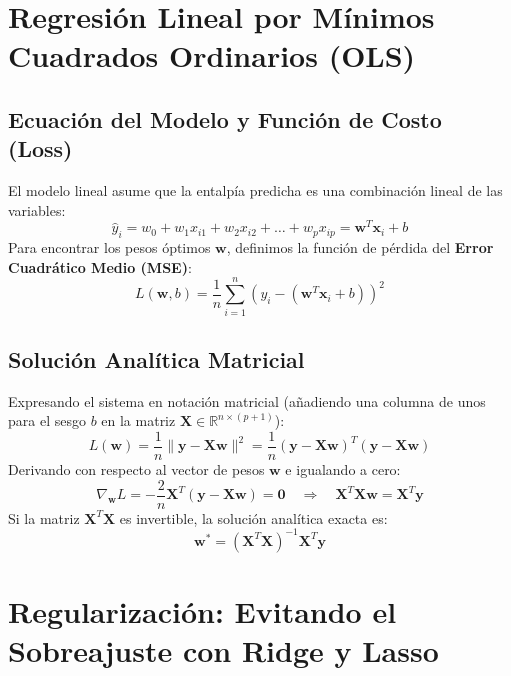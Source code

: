 \documentclass[11pt,letterpaper]{report}
\begin{document}
\section{Regresión Lineal por Mínimos Cuadrados Ordinarios (OLS)}

\subsection{Ecuación del Modelo y Función de Costo (Loss)}
El modelo lineal asume que la entalpía predicha es una combinación lineal de las variables:
\begin{equation}
    \hat{y}_i = w_0 + w_1 x_{i1} + w_2 x_{i2} + \dots + w_p x_{ip} = \mathbf{w}^T \mathbf{x}_i + b
\end{equation}
Para encontrar los pesos óptimos $\mathbf{w}$, definimos la función de pérdida del \textbf{Error Cuadrático Medio (MSE)}:
\begin{equation}
    L(\mathbf{w}, b) = \frac{1}{n} \sum_{i=1}^n \left( y_i - (\mathbf{w}^T \mathbf{x}_i + b) \right)^2
\end{equation}

\subsection{Solución Analítica Matricial}
Expresando el sistema en notación matricial (añadiendo una columna de unos para el sesgo $b$ en la matriz $\mathbf{X} \in \mathbb{R}^{n \times (p+1)}$):
\begin{equation}
    L(\mathbf{w}) = \frac{1}{n} \|\mathbf{y} - \mathbf{X}\mathbf{w}\|^2 = \frac{1}{n} (\mathbf{y} - \mathbf{X}\mathbf{w})^T (\mathbf{y} - \mathbf{X}\mathbf{w})
\end{equation}
Derivando con respecto al vector de pesos $\mathbf{w}$ e igualando a cero:
\begin{equation}
    \nabla_{\mathbf{w}} L = -\frac{2}{n} \mathbf{X}^T (\mathbf{y} - \mathbf{X}\mathbf{w}) = \mathbf{0} \quad \Longrightarrow \quad \mathbf{X}^T \mathbf{X} \mathbf{w} = \mathbf{X}^T \mathbf{y}
\end{equation}
Si la matriz $\mathbf{X}^T \mathbf{X}$ es invertible, la solución analítica exacta es:
\begin{equation}
    \mathbf{w}^* = (\mathbf{X}^T \mathbf{X})^{-1} \mathbf{X}^T \mathbf{y}
\end{equation}

\section{Regularización: Evitando el Sobreajuste con Ridge y Lasso}
\end{document}
